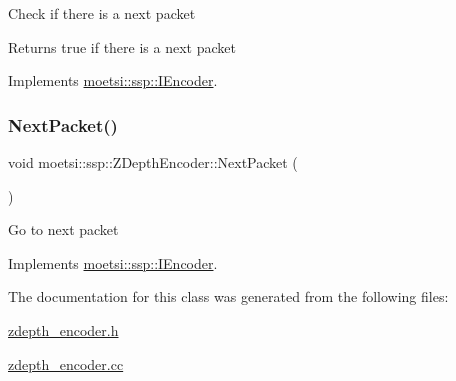 Check if there is a next packet \begin{DoxyReturn}{Returns}
true if there is a next packet 
\end{DoxyReturn}


Implements \hyperlink{classmoetsi_1_1ssp_1_1IEncoder_a2af8e23d841ef61f6ee4037e56a3694d}{moetsi\+::ssp\+::\+I\+Encoder}.

\mbox{\label{classmoetsi_1_1ssp_1_1ZDepthEncoder_ae3911f396fc8b86c04c94dc71e1c0672}} 
\subsubsection{\texorpdfstring{Next\+Packet()}{NextPacket()}}
{\footnotesize\ttfamily void moetsi\+::ssp\+::\+Z\+Depth\+Encoder\+::\+Next\+Packet (\begin{DoxyParamCaption}{ }\end{DoxyParamCaption})\hspace{0.3cm}{\ttfamily [virtual]}}

Go to next packet 

Implements \hyperlink{classmoetsi_1_1ssp_1_1IEncoder_afac3ddcf2f49be16020c83cb9e0fb274}{moetsi\+::ssp\+::\+I\+Encoder}.



The documentation for this class was generated from the following files\+:\begin{DoxyCompactItemize}
\item 
\hyperlink{zdepth__encoder_8h}{zdepth\+\_\+encoder.\+h}\item 
\hyperlink{zdepth__encoder_8cc}{zdepth\+\_\+encoder.\+cc}\end{DoxyCompactItemize}
